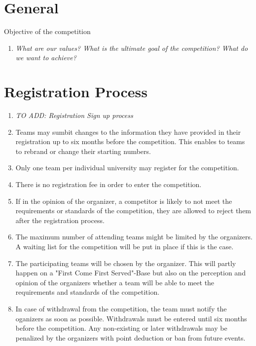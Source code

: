 

 \section{General}
  
    Objective of the competition
    \begin{enumerate}
      \item \emph{What are our values? What is the ultimate goal of the competition? What do we want to achieve?}
    \end{enumerate}

  \section{Registration Process}
      \begin{enumerate}
        \item \emph{TO ADD: Registration Sign up process}
        \item Teams may sumbit changes to the information they have provided in their registration up to six months before the competition. This enables to teams to rebrand or change their starting numbers.
        \item Only one team per individual university may register for the competition.  
        \item There is no registration fee in order to enter the competition. 
        \item If in the opinion of the organizer, a competitor is likely to not meet the requirements or standards
        of the competition, they are allowed to reject them after the registration process. 
        \item The maximum number of attending teams might be limited by the organizers. A waiting list for the competition
        will be put in place if this is the case. 
        \item The participating teams will be chosen by the organizer. This will partly happen on a "First Come First Served"-Base but also
        on the perception and opinion of the organizers whether a team will be able to meet the requirements and standards of the competition. 
        \item In case of withdrawal from the competition, the team must notify the oganizers as soon as possible. Withdrawals must be entered until six months before the competition. 
        Any non-existing or later withdrawals may be penalized by the organizers with point deduction or ban from future events. 
      \end{enumerate}

